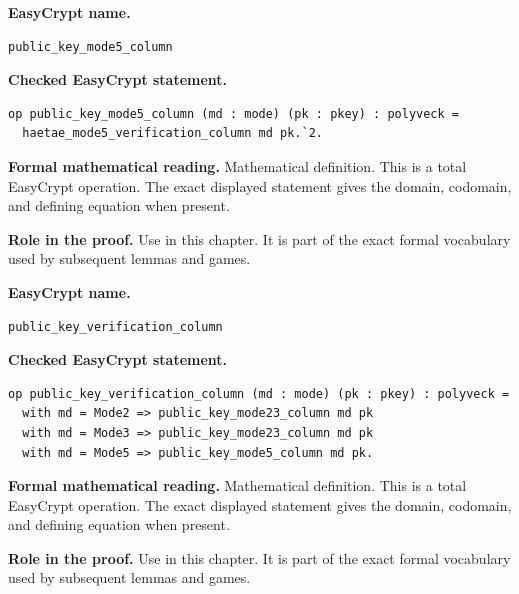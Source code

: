 \begin{formaldefinition}
\noindent\textbf{EasyCrypt name.}
\begin{lstlisting}[language=EasyCrypt,basicstyle=\ttfamily\scriptsize]
public_key_mode5_column
\end{lstlisting}
\noindent\textbf{Checked EasyCrypt statement.}
\begin{lstlisting}[language=EasyCrypt,basicstyle=\ttfamily\scriptsize]
op public_key_mode5_column (md : mode) (pk : pkey) : polyveck =
  haetae_mode5_verification_column md pk.`2.
\end{lstlisting}
\noindent\textbf{Formal mathematical reading.}
Mathematical definition. This is a total EasyCrypt operation.  The exact displayed statement gives the domain, codomain, and defining equation when present.

\noindent\textbf{Role in the proof.}
Use in this chapter. It is part of the exact formal vocabulary used by subsequent lemmas and games.

\end{formaldefinition}

\begin{formaldefinition}
\noindent\textbf{EasyCrypt name.}
\begin{lstlisting}[language=EasyCrypt,basicstyle=\ttfamily\scriptsize]
public_key_verification_column
\end{lstlisting}
\noindent\textbf{Checked EasyCrypt statement.}
\begin{lstlisting}[language=EasyCrypt,basicstyle=\ttfamily\scriptsize]
op public_key_verification_column (md : mode) (pk : pkey) : polyveck =
  with md = Mode2 => public_key_mode23_column md pk
  with md = Mode3 => public_key_mode23_column md pk
  with md = Mode5 => public_key_mode5_column md pk.
\end{lstlisting}
\noindent\textbf{Formal mathematical reading.}
Mathematical definition. This is a total EasyCrypt operation.  The exact displayed statement gives the domain, codomain, and defining equation when present.

\noindent\textbf{Role in the proof.}
Use in this chapter. It is part of the exact formal vocabulary used by subsequent lemmas and games.

\end{formaldefinition}

